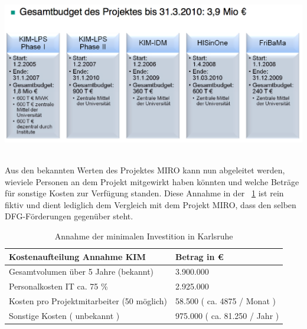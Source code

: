 \documentclass[a4paper]{article}
\makeatletter
\newcommand\captionof[1]{\def\@captype{#1}\caption}
\makeatother
\begin{document}
{\centering \includegraphics[width=15.425cm,height=7.153cm]{INMAusarbeitung02-img/INMAusarbeitung02-img013.png}
\captionof{figure}[Überblick zum Projekt{}-Budget KIM (Juling Best Practice Workshop 2008)]{Überblick zum Projekt-Budget
KIM \textcolor[rgb]{1.0,0.2,0.2}{(}\textcolor{red}{Juling Best Practice Workshop 2008)}}
\par}
{\sffamily
Aus den bekannten Werten des Projektes MIRO kann nun abgeleitet werden, wieviele Personen an dem Projekt mitgewirkt
haben könnten und welche Beträge für sonstige Kosten zur Verfügung standen. Diese Annahme in der
\textcolor[rgb]{0.6,0.0,1.0}{\tablename~\ref{seq:refTable10}} ist rein fiktiv und dient lediglich dem Vergleich mit dem
Projekt MIRO, dass den selben DFG-Förderungen gegenüber steht.}


\bigskip

\begin{table}
\centering
\begin{tabular}{|m{7.4550004cm}|m{5.065cm}|}

\hline
{\sffamily\bfseries\color{black} Kostenaufteilung Annahme KIM} &
{\sffamily\bfseries\color{black} Betrag in €}\\\hline
{\sffamily\color{black} Gesamtvolumen über 5 Jahre (bekannt)} &
{\sffamily\color{black} 3.900.000}\\\hline
{\sffamily\color{black} Personalkosten IT ca. 75 \%} &
{\sffamily\color{black} 2.925.000}\\\hline
{\sffamily\color{black} Kosten pro Projektmitarbeiter (50 möglich)} &
{\sffamily\color{black} 58.500 ( ca. 4875 / Monat )}\\\hline
{\sffamily\color{black} Sonstige Kosten ( unbekannt )} &
{\sffamily\color{black} 975.000 ( ca. 81.250 / Jahr )}\\\hline\end{tabular}
\caption{Annahme der minimalen Investition in Karlsruhe}
\label{seq:refTable10}
\end{table}
\end{document}
